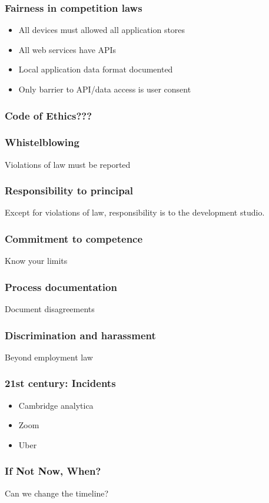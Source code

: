\begin{frame}[fragile]
\frametitle{Fairness in competition laws}

\end{frame}

\begin{itemize}
\item All devices must allowed all application stores
\item All web services have APIs
\item Local application data format documented
\item Only barrier to API/data access is user consent
\end{itemize}

\begin{frame}[fragile]
\frametitle{Code of Ethics???}

\end{frame}


\begin{frame}[fragile]
\frametitle{Whistelblowing}

Violations of law must be reported

\end{frame}

\begin{frame}[fragile]
\frametitle{Responsibility to principal}

Except for violations of law,
responsibility is to the development studio.

\end{frame}

\begin{frame}[fragile]
\frametitle{Commitment to competence}

Know your limits

\end{frame}

\begin{frame}[fragile]
\frametitle{Process documentation}

Document disagreements

\end{frame}

\begin{frame}[fragile]
\frametitle{Discrimination and harassment}

Beyond employment law

\end{frame}

\begin{frame}[fragile]
\frametitle{21st century: Incidents}

\begin{itemize}
\item Cambridge analytica
\item Zoom
\item Uber
\end{itemize}

\end{frame}

\begin{frame}[fragile]
\frametitle{If Not Now, When?}

Can we change the timeline?

\end{frame}


